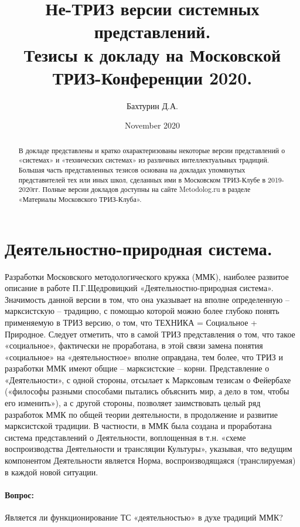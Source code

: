 \documentclass[11pt,a4paper]{article}
\title{Не-ТРИЗ версии системных представлений.\\[1em] \Large Тезисы к докладу на
  Московской ТРИЗ-Конференции 2020.}
\author{Бахтурин Д.А.}
\date{November 2020}
\begin{document}
\maketitle
\tableofcontents

\begin{abstract}
  В докладе представлены и кратко охарактеризованы некоторые версии
  представлений о «системах» и «технических системах» из различных
  интеллектуальных традиций. Большая часть представленных тезисов основана на
  докладах упомянутых представителей тех или иных школ, сделанных ими в
  Московском ТРИЗ-Клубе в 2019-2020гг. Полные версии докладов доступны на
  сайте Metodolog.ru в разделе «Материалы Московского ТРИЗ-Клуба».
\end{abstract}

\section{Деятельностно-природная система.}

Разработки Московского методологического кружка (ММК), наиболее развитое
описание в работе П.Г.Щедровицкий «Деятельностно-природная система».
Значимость данной версии в том, что она указывает на вполне определенную –
марксистскую – традицию, с помощью которой можно более глубоко понять
применяемую в ТРИЗ версию, о том, что ТЕХНИКА = Социальное + Природное.
Следует отметить, что в самой ТРИЗ представления о том, что такое
«социальное», фактически не проработана, в этой связи замена понятия
«социальное» на «деятельностное» вполне оправдана, тем более, что ТРИЗ и
разработки ММК имеют общие – марксистские – корни. Представление о
«Деятельности», с одной стороны, отсылает к Марксовым тезисам о Фейербахе
(«философы разными способами пытались объяснить мир, а дело в том, чтобы его
изменить»), а с другой стороны, позволяет заимствовать целый ряд разработок
ММК по общей теории деятельности, в продолжение и развитие марксистской
традиции. В частности, в ММК была создана и проработана система представлений
о Деятельности, воплощенная в т.н. «схеме воспроизводства Деятельности и
трансляции Культуры», указывая, что ведущим компонентом Деятельности является
Норма, воспроизводящаяся (транслируемая) в каждой новой ситуации.

\paragraph{Вопрос:}
Является ли функционирование ТС «деятельностью» в духе традиций ММК?
\end{document}
